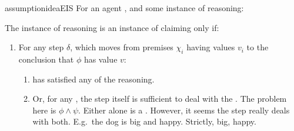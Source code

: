 \begin{note}
  \begin{restatable}{assumption}{ideaEIS}
    \label{idea:CS:B}
    \label{assumption:CS}
    For an agent \vAgent{}, and some instance of reasoning:

    The instance of reasoning is an instance of claiming \support{} only if:
    \begin{enumerate}
    \item
      \label{idea:CS:B:step}
      For any step \(\delta\), which moves from premises \(\chi_{i}\) having values \(v_{i}\) to the conclusion that \(\phi\) has value \(v\):
      \begin{enumerate}[label=\alph*., ref=(\alph*)]
      \item
        \vAgent{} has satisfied any \requ{} of the reasoning.
      \item
        Or, for any \requ{}, the step itself is sufficient to deal with the \requ{}. {\color{red} The problem here is \(\phi \land \psi\). Either alone is a \requ{}. However, it seems the step really deals with both.}
        E.g.\ the dog is big and happy.
        Strictly, big, happy.


\end{enumerate}
\end{enumerate}
\end{restatable}
\end{note}
